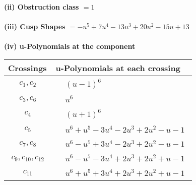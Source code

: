 \documentclass[1p]{elsarticle_modified}
\theoremstyle{definition}
\begin{document}
\flushleft \textbf{(ii) Obstruction class $= 1$}\\~\\
\flushleft \textbf{(iii) Cusp Shapes $= - u^5+7 u^4-13 u^3+20 u^2-15 u+13$}\\~\\
\newpage\renewcommand{\arraystretch}{1}
\flushleft \textbf{(iv) u-Polynomials at the component}\newline \\
\begin{tabular}{m{50pt}|m{274pt}}
Crossings & \hspace{64pt}u-Polynomials at each crossing \\
\hline $$\begin{aligned}c_{1},c_{2}\end{aligned}$$&$\begin{aligned}
&(u-1)^6
\end{aligned}$\\
\hline $$\begin{aligned}c_{3},c_{6}\end{aligned}$$&$\begin{aligned}
&u^6
\end{aligned}$\\
\hline $$\begin{aligned}c_{4}\end{aligned}$$&$\begin{aligned}
&(u+1)^6
\end{aligned}$\\
\hline $$\begin{aligned}c_{5}\end{aligned}$$&$\begin{aligned}
&u^6+u^5-3 u^4-2 u^3+2 u^2- u-1
\end{aligned}$\\
\hline $$\begin{aligned}c_{7},c_{8}\end{aligned}$$&$\begin{aligned}
&u^6- u^5+3 u^4-2 u^3+2 u^2- u-1
\end{aligned}$\\
\hline $$\begin{aligned}c_{9},c_{10},c_{12}\end{aligned}$$&$\begin{aligned}
&u^6- u^5-3 u^4+2 u^3+2 u^2+u-1
\end{aligned}$\\
\hline $$\begin{aligned}c_{11}\end{aligned}$$&$\begin{aligned}
&u^6+u^5+3 u^4+2 u^3+2 u^2+u-1
\end{aligned}$\\
\hline
\end{tabular}\\~\\
\end{document}
